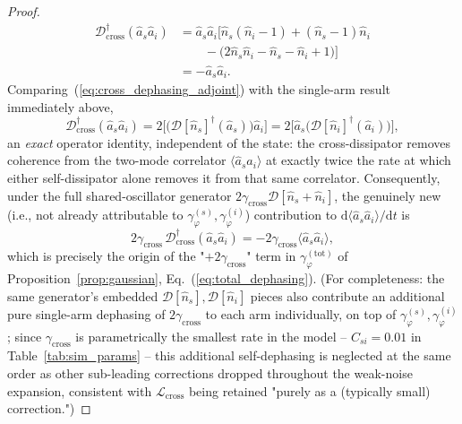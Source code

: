 \documentclass[journal]{IEEEtran}
\begin{document}
\begin{proof}
\begin{equation}
\begin{split}
\mathcal D_{\text{cross}}^\dagger(\hat a_s\hat a_i) &= \hat a_s\hat a_i\Big[\hat n_s(\hat n_i-1)+(\hat n_s-1)\hat n_i\\
&\qquad -\big(2\hat n_s\hat n_i-\hat n_s-\hat n_i+1\big)\Big]\\
&= -\hat a_s\hat a_i.
\end{split}
\end{equation}
Comparing~(\ref{eq:cross_dephasing_adjoint}) with the single-arm result immediately above,
\begin{equation}\label{eq:factor_of_two}
\mathcal D_{\text{cross}}^\dagger(\hat a_s\hat a_i) = 2\Big[\big(\mathcal D[\hat n_s]^\dagger(\hat a_s)\big)\hat a_i\Big] = 2\Big[\hat a_s\big(\mathcal D[\hat n_i]^\dagger(\hat a_i)\big)\Big],
\end{equation}
an \emph{exact} operator identity, independent of the state: the cross-dissipator removes coherence from the two-mode correlator $\langle\hat a_s\hat a_i\rangle$ at exactly twice the rate at which either self-dissipator alone removes it from that same correlator. Consequently, under the full shared-oscillator generator $2\gamma_{\text{cross}}\mathcal D[\hat n_s+\hat n_i]$, the genuinely new (i.e., not already attributable to $\gamma_\varphi^{(s)},\gamma_\varphi^{(i)}$) contribution to $\mathrm d\langle\hat a_s\hat a_i\rangle/\mathrm dt$ is
\begin{equation}
2\gamma_{\text{cross}}\,\mathcal D_{\text{cross}}^\dagger(\hat a_s\hat a_i) = -2\gamma_{\text{cross}}\langle\hat a_s\hat a_i\rangle,
\end{equation}
which is precisely the origin of the "$+2\gamma_{\text{cross}}$" term in $\gamma_\varphi^{(\text{tot})}$ of Proposition~\ref{prop:gaussian}, Eq.~(\ref{eq:total_dephasing}). (For completeness: the same generator's embedded $\mathcal D[\hat n_s],\mathcal D[\hat n_i]$ pieces also contribute an additional pure single-arm dephasing of $2\gamma_{\text{cross}}$ to each arm individually, on top of $\gamma_\varphi^{(s)},\gamma_\varphi^{(i)}$; since $\gamma_{\text{cross}}$ is parametrically the smallest rate in the model -- $C_{si}=0.01$ in Table~\ref{tab:sim_params} -- this additional self-dephasing is neglected at the same order as other sub-leading corrections dropped throughout the weak-noise expansion, consistent with $\mathcal L_{\text{cross}}$ being retained "purely as a (typically small) correction.")


\end{proof}
\end{document}

